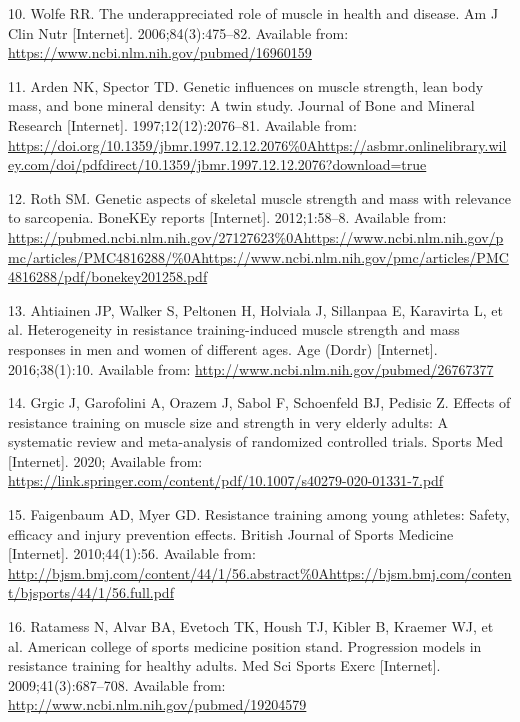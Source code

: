 \documentclass[twoside,10pt]{gihclass} %
\begin{document}
\leavevmode\hypertarget{ref-RN763}{}%
10. Wolfe RR. The underappreciated role of muscle in health and disease. Am J Clin Nutr {[}Internet{]}. 2006;84(3):475--82. Available from: \url{https://www.ncbi.nlm.nih.gov/pubmed/16960159}

\leavevmode\hypertarget{ref-RN2526}{}%
11. Arden NK, Spector TD. Genetic influences on muscle strength, lean body mass, and bone mineral density: A twin study. Journal of Bone and Mineral Research {[}Internet{]}. 1997;12(12):2076--81. Available from: \url{https://doi.org/10.1359/jbmr.1997.12.12.2076\%0Ahttps://asbmr.onlinelibrary.wiley.com/doi/pdfdirect/10.1359/jbmr.1997.12.12.2076?download=true}

\leavevmode\hypertarget{ref-RN2527}{}%
12. Roth SM. Genetic aspects of skeletal muscle strength and mass with relevance to sarcopenia. BoneKEy reports {[}Internet{]}. 2012;1:58--8. Available from: \url{https://pubmed.ncbi.nlm.nih.gov/27127623\%0Ahttps://www.ncbi.nlm.nih.gov/pmc/articles/PMC4816288/\%0Ahttps://www.ncbi.nlm.nih.gov/pmc/articles/PMC4816288/pdf/bonekey201258.pdf}

\leavevmode\hypertarget{ref-RN1741}{}%
13. Ahtiainen JP, Walker S, Peltonen H, Holviala J, Sillanpaa E, Karavirta L, et al. Heterogeneity in resistance training-induced muscle strength and mass responses in men and women of different ages. Age (Dordr) {[}Internet{]}. 2016;38(1):10. Available from: \url{http://www.ncbi.nlm.nih.gov/pubmed/26767377}

\leavevmode\hypertarget{ref-RN2534}{}%
14. Grgic J, Garofolini A, Orazem J, Sabol F, Schoenfeld BJ, Pedisic Z. Effects of resistance training on muscle size and strength in very elderly adults: A systematic review and meta-analysis of randomized controlled trials. Sports Med {[}Internet{]}. 2020; Available from: \url{https://link.springer.com/content/pdf/10.1007/s40279-020-01331-7.pdf}

\leavevmode\hypertarget{ref-RN2536}{}%
15. Faigenbaum AD, Myer GD. Resistance training among young athletes: Safety, efficacy and injury prevention effects. British Journal of Sports Medicine {[}Internet{]}. 2010;44(1):56. Available from: \url{http://bjsm.bmj.com/content/44/1/56.abstract\%0Ahttps://bjsm.bmj.com/content/bjsports/44/1/56.full.pdf}

\leavevmode\hypertarget{ref-RN1}{}%
16. Ratamess N, Alvar BA, Evetoch TK, Housh TJ, Kibler B, Kraemer WJ, et al. American college of sports medicine position stand. Progression models in resistance training for healthy adults. Med Sci Sports Exerc {[}Internet{]}. 2009;41(3):687--708. Available from: \url{http://www.ncbi.nlm.nih.gov/pubmed/19204579}
\end{document}
